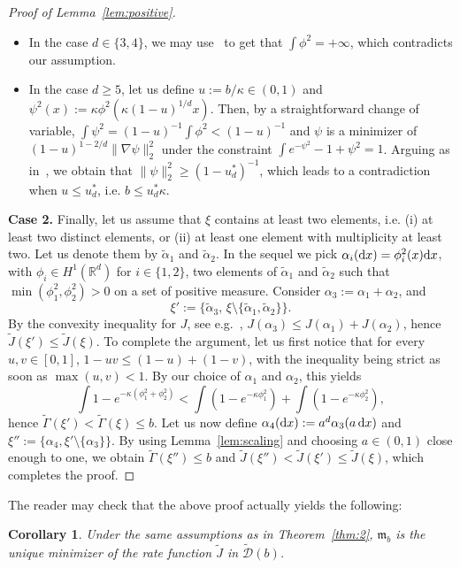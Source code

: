 \documentclass[a4paper,11pt]{amsart}
\numberwithin{equation}{section}
\newtheorem{corollary}[theorem]{Corollary}
\newcommand{\bbR}{{\ensuremath{\mathbb R}} }
\newcommand{\cD}{{\ensuremath{\mathcal D}} }
\newcommand{\ga}{\alpha}
\renewcommand{\tilde}{\widetilde}          %
\newcommand{\dd}{\text{\rm d}}             %
\newcommand{\8}{\infty}
\newcommand{\beq}{\begin{equation}}
\newcommand{\eeq}{\end{equation}}
\newcommand{\fm}{\mathfrak{m}}
\begin{document}
\begin{proof}[Proof of Lemma~\ref{lem:positive}]
\begin{itemize}
\item In the case $d\in\{3,4\}$, we may use~\cite[Lemma 14]{BBH2001} to get that $\int \phi^2 = +\infty$, which contradicts our assumption.
\item In the case $d\ge 5$, let us define $u := b/\kappa \in (0,1)$ and $\psi^2(x):= \kappa \phi^2(\kappa (1-u)^{1/d} x)$. Then, by a straightforward change of variable, $\int \psi^2 = (1-u)^{-1}\int \phi^2 < (1-u)^{-1}$ and $\psi$ is a minimizer of $(1-u)^{1-2/d}\|\nabla\psi\|_2^2$ under the constraint $\int e^{-\psi^2}-1+\psi^2 = 1$. Arguing as in~\cite[Proof of Theorem 5(ii), Item 1]{BBH2001}, we obtain that $\|\psi\|_2^2 \ge (1-u_d^*)^{-1}$, which leads to a contradiction when $u\le u_d^*$, i.e. $b\le u_d^*\kappa$.
\end{itemize}
{\bf \noindent Case 2.}  Finally, let us assume that $\xi$ contains at least two elements, i.e. (i) at least two distinct elements, or (ii) at least one element with multiplicity at least two. Let us denote them by $\tilde \ga_1$ and $\tilde \ga_2$. In the sequel we pick $\ga_i(\dd x) = \phi_i^2(x)\dd x$, with $\phi_i \in H^1(\bbR^d)$ for $i\in\{1,2\}$, two elements of $\tilde \ga_1$ and $\tilde \ga_2$ such that $\min(\phi_1^2, \phi_2^2)>0$ on a set of positive measure. Consider $\ga_3 := \ga_1 + \ga_2$, and
\beq
\xi' := \{\tilde\ga_3,\, \xi\setminus\{\tilde\ga_1, \tilde \ga_2\}\}.
\eeq
By the convexity inequality for $J$, see e.g.~\cite[Theorem~7.8]{LiebLoss}, $J(\ga_3) \le J(\ga_1) + J(\ga_2)$, hence $\tilde J(\xi') \le \tilde J(\xi)$. To complete the argument, let us first notice that for every $u,v\in[0,1]$, $1- uv \le (1-u) + (1-v)$, with the inequality being strict as soon as $\max(u,v)<1$. By our choice of $\ga_1$ and $\ga_2$, this yields
\beq
\int 1 - e^{-\kappa(\phi_1^2 + \phi_2^2)} <
\int (1 - e^{-\kappa \phi_1^2}) +
\int (1 - e^{-\kappa \phi_2^2}),
\eeq
hence $\tilde\Gamma(\xi')< \tilde\Gamma(\xi)\le b$. Let us now define $\ga_4(\dd x) := a^{d}\ga_3(a\, \dd x)$ and $\xi'' := \{\ga_4, \xi'\setminus\{\ga_3\}\}$. By using Lemma~\ref{lem:scaling} and choosing $a\in (0,1)$ close enough to one, we obtain $\tilde\Gamma(\xi'')\le b$ and $\tilde J(\xi'')<\tilde J(\xi') \le \tilde J(\xi)$, which completes the proof.
\end{proof}
%
 The reader may check that the above proof actually yields the following:
\begin{corollary}
	\label{cor:unique}
Under the same assumptions as in Theorem~\ref{thm:2}, $\fm_b$ is the unique minimizer of the rate function $\tilde J$ in $\tilde\cD(b)$.
\end{corollary}
\end{document}
